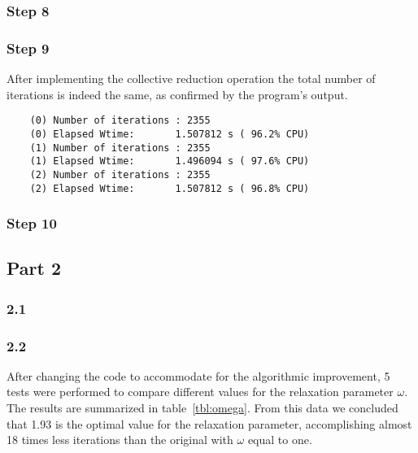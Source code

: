 \subsubsection{Step 8}
\subsubsection{Step 9}

After implementing the collective reduction operation the total number of iterations is indeed the same, as confirmed by the program's output.

\begin{lstlisting}
	(0) Number of iterations : 2355
	(0) Elapsed Wtime:       1.507812 s ( 96.2% CPU)
	(1) Number of iterations : 2355
	(1) Elapsed Wtime:       1.496094 s ( 97.6% CPU)
	(2) Number of iterations : 2355
	(2) Elapsed Wtime:       1.507812 s ( 96.8% CPU)
\end{lstlisting}

\subsubsection{Step 10}


\subsection{Part 2}

\subsubsection{2.1}
\subsubsection{2.2}

After changing the code to accommodate for the algorithmic improvement, 5 tests were performed to compare different values for the relaxation parameter $\omega$. The results are summarized in table~\ref{tbl:omega}.
From this data we concluded that 1.93 is the optimal value for the relaxation parameter, accomplishing almost 18 times less iterations than the original with $\omega$ equal to one.

